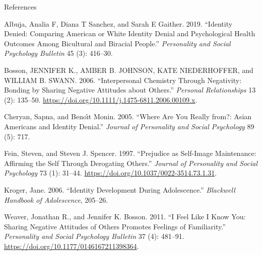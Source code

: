 \documentclass[
  ignorenonframetext,
  aspectratio=169,
]{beamer}
\newlength{\cslhangindent}
\newenvironment{CSLReferences}[2] %
 {\begin{list}{}{%
  \setlength{\itemindent}{0pt}
  \setlength{\leftmargin}{0pt}
  \setlength{\parsep}{0pt}
  \ifodd #1
   \setlength{\leftmargin}{\cslhangindent}
   \setlength{\itemindent}{-1\cslhangindent}
  \fi
  \setlength{\itemsep}{#2\baselineskip}}}
 {\end{list}}
\begin{document}
\begin{frame}{References}
\label{references}
\label{refs}
\begin{CSLReferences}{1}{0}
Albuja, Analia F, Diana T Sanchez, and Sarah E Gaither. 2019.
{``Identity Denied: Comparing American or White Identity Denial and
Psychological Health Outcomes Among Bicultural and Biracial People.''}
\emph{Personality and Social Psychology Bulletin} 45 (3): 416--30.

Bosson, JENNIFER K., AMBER B. JOHNSON, KATE NIEDERHOFFER, and WILLIAM B.
SWANN. 2006. {``Interpersonal Chemistry Through Negativity: Bonding by
Sharing Negative Attitudes about Others.''} \emph{Personal
Relationships} 13 (2): 135--50.
\url{https://doi.org/10.1111/j.1475-6811.2006.00109.x}.

Cheryan, Sapna, and Benoı̂t Monin. 2005. {``Where Are You Really from?:
Asian Americans and Identity Denial.''} \emph{Journal of Personality and
Social Psychology} 89 (5): 717.

Fein, Steven, and Steven J. Spencer. 1997. {``Prejudice as Self-Image
Maintenance: Affirming the Self Through Derogating Others.''}
\emph{Journal of Personality and Social Psychology} 73 (1): 31--44.
\url{https://doi.org/10.1037/0022-3514.73.1.31}.

Kroger, Jane. 2006. {``Identity Development During Adolescence.''}
\emph{Blackwell Handbook of Adolescence}, 205--26.

Weaver, Jonathan R., and Jennifer K. Bosson. 2011. {``I Feel Like I Know
You: Sharing Negative Attitudes of Others Promotes Feelings of
Familiarity.''} \emph{Personality and Social Psychology Bulletin} 37
(4): 481--91. \url{https://doi.org/10.1177/0146167211398364}.

\end{CSLReferences}
\end{frame}
\end{document}
